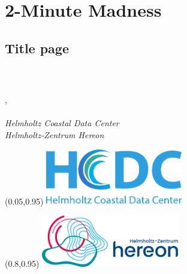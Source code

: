 
\section{2-Minute Madness} \label{sec:madness}
\subsection*{Title page}  %

\begin{frame}
	\frametitle[MDE title page]{}
	\vspace{2.0cm}
	\begin{center}
		{\color{black}
			\textbf{
				\fontsize{36pt}{38pt}\selectfont \presentationtitle\\
				\vspace{1.5cm}}}
		\textbf{
			\fontsize{26pt}{28pt}\selectfont \presentationsubtitle \\
		}
		\vspace{1.5cm}
		{\fontsize{18pt}{20pt}\selectfont
			\location, \presentationdate \\
			\vspace{1ex}
			\hyperlink{frm:author}{\presentationauthor} \\
			\vspace{1.5cm}
			\textit{
				Helmholtz Coastal Data Center \\
				Helmholtz-Zentrum Hereon
		}}

	\end{center}

    \begin{textblock*}{6cm}(0.05\textwidth,0.95\textheight)
        \href{https://hcdc.hereon.de}{\includegraphics[width=6cm]{figures/hcdc.pdf}}
    \end{textblock*}

    \begin{textblock*}{6cm}(0.8\textwidth,0.95\textheight)
        \hyperlink{frm:map}{\includegraphics[width=6cm]{figures/hereon.png}}
    \end{textblock*}

\end{frame}

